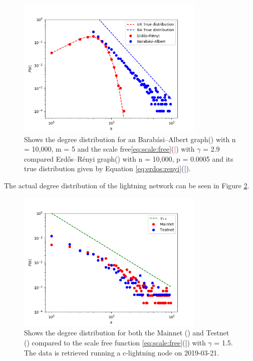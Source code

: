 \begin{figure}[!htb]
	\hspace*{-0.5cm} 
	\centering
	\includegraphics[width=9cm]{images/scale_free_degree_distribution.png}
	\caption{Shows the degree distribution for an Barabási–Albert graph(\tikzcircle[red, fill=red]{2pt}) with n = 10,000, m = 5 and the scale free\ref{eq:scale:free}(\textcolor{red}{|}) with $\gamma$ = 2.9 compared Erdős–Rényi graph(\tikzcircle[blue, fill=blue]{2pt}) with n = 10,000, p = 0.0005 and its true distribution given by Equation \ref{eq:erdos:renyi}(\textcolor{blue}{|}).
	}
	\label{fig:scale_free}
	\hspace*{2mm} 
\end{figure}


The actual degree distribution of the lightning network can be seen in Figure \ref{fig:real_network}.

\begin{figure}[!htb]
	\hspace*{-0.5cm} 
	\centering
	\includegraphics[width=9cm]{images/main-testnet_degree_distribution.png}
	\caption{Shows the degree distribution for both the Mainnet (\tikzcircle[red, fill=red]{2pt}) and Testnet (\tikzcircle[blue, fill=blue]{2pt})
		compared to the scale free function \ref{eq:scale:free}(\textcolor{black}{|}) with $\gamma$ = 1.5. The data is retrieved running a c-lightning node\cite{repository:clightning} on 2019-03-21.
	}
	\label{fig:real_network}
	\hspace*{2mm} 
\end{figure}

